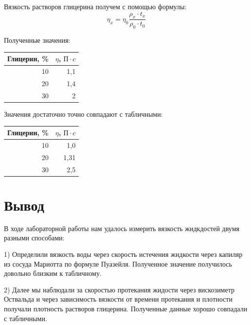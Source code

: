 \documentclass[11pt]{article}
\begin{document}
\begin{enumerate}
    Вязкость растворов глицерина получем с помощью формулы:
    \[ \eta_x = \eta_0 \frac{\rho_x \cdot t_x}{\rho_0 \cdot t_0}\]

    Полученные значения: 

    \begin{table}[H]
    \centering
    \begin{tabular}{|r|r|}
    \hline
    \multicolumn{1}{|l|}{\textbf{Глицерин, \%}} & \multicolumn{1}{l|}{\textbf{$\eta$, $П\cdot c$}} \\ \hline
    10                                          & 1,1                                 \\ \hline
    20                                          & 1,4                                 \\ \hline
    30                                          & 2                                   \\ \hline
    \end{tabular}
    \end{table}

    Значения достаточно точно совпадают с табличными: 

    \begin{table}[H]
    \centering
    \begin{tabular}{|r|r|}
    \hline
    \multicolumn{1}{|l|}{\textbf{Глицерин, \%}} & \multicolumn{1}{l|}{\textbf{$\eta$, $П\cdot c$}} \\ \hline
    10                                          & 1,0                                \\ \hline
    20                                          & 1,31                                 \\ \hline
    30                                          & 2,5                                  \\ \hline
    \end{tabular}
    \end{table}


\end{enumerate}



\section{Вывод} 

    В ходе лабораторной работы нам удалось измерить вязкость жидкдостей двумя разными способами:


    1) Определили вязкость воды через скорость истечения жидкости через капиляр из сосуда Мариотта по формуле Пуазейля. Полученное значение получилось довольно близким к табличному.


    2) Далее мы наблюдали за скоростью протекания жидости через вискозиметр Оствальда и через зависимость вязкости от времени протекания и плотности получали плотность растворов глицерина. Полученные данные хорошо совпадали с табличными.
\end{document}
